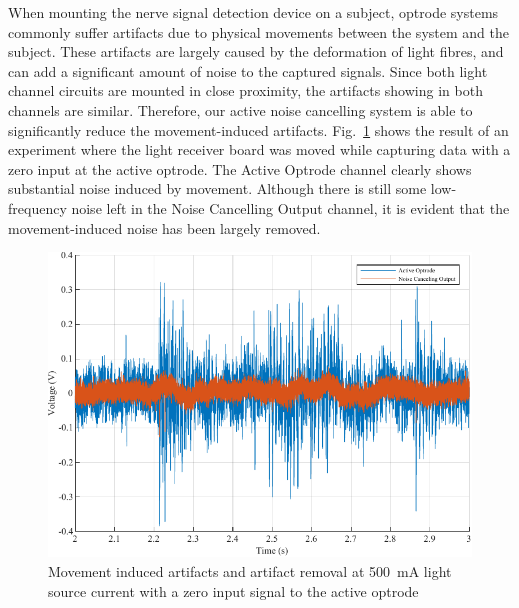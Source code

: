 When mounting the nerve signal detection device on a subject, optrode systems commonly suffer artifacts due to physical movements between the system and the subject.  These artifacts are largely caused by the deformation of light fibres, and can add a significant amount of noise to the captured signals.  Since both light channel circuits are mounted in close proximity, the artifacts showing in both channels are similar.  Therefore, our active noise cancelling system is able to significantly reduce the movement-induced artifacts.  Fig.~\ref{fig_Movement Artifact} shows the result of an experiment where the light receiver board was moved while capturing data with a zero input at the active optrode.  The Active Optrode channel clearly shows substantial noise induced by movement.  Although there is still some low-frequency noise left in the Noise Cancelling Output channel, it is evident that the movement-induced noise has been largely removed.

\begin{figure}[h]
\centerline{\includegraphics[scale=1]{5-Experiment/Movement Artifact.pdf}}
\caption{Movement induced artifacts and artifact removal at \qty{500}{\mA} light source current with a zero input signal to the active optrode}
\label{fig_Movement Artifact}
\end{figure}

